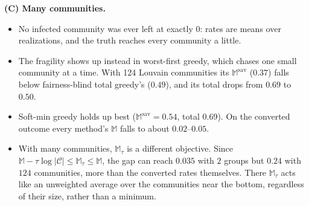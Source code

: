 \textbf{(C) Many communities.}
\begin{itemize}
\item No infected community was ever left at exactly $0$: rates are means over realizations, and the truth reaches every community a little.
\item The fragility shows up instead in worst-first greedy, which chases one small community at a time. With 124 Louvain communities its $\mathbb{M}^{\mathrm{sav}}$ ($0.37$) falls below fairness-blind total greedy's ($0.49$), and its total drops from $0.69$ to $0.50$.
\item Soft-min greedy holds up best ($\mathbb{M}^{\mathrm{sav}}=0.54$, total $0.69$). On the converted outcome every method's $\mathbb{M}$ falls to about $0.02$--$0.05$.
\item With many communities, $\mathbb{M}_\tau$ is a different objective. Since $\mathbb{M}-\tau\log|\mathcal{C}|\le\mathbb{M}_\tau\le\mathbb{M}$, the gap can reach $0.035$ with $2$ groups but $0.24$ with $124$ communities, more than the converted rates themselves. There $\mathbb{M}_\tau$ acts like an unweighted average over the communities near the bottom, regardless of their size, rather than a minimum.
\end{itemize}
